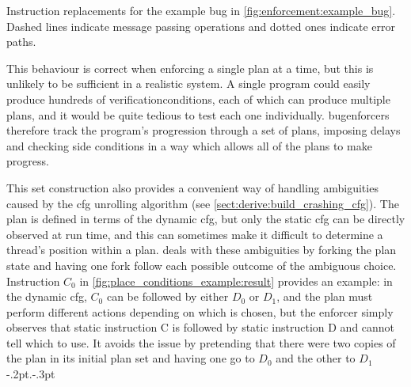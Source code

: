 \begin{sanefig}
  {\hfill}
  \caption{Instruction replacements for the example bug in
    \autoref{fig:enforcement:example_bug}.  Dashed lines indicate
    message passing operations and dotted ones indicate error paths.}
  \label{fig:enforcement:example_bug:replacements}
\end{sanefig}

This behaviour is correct when enforcing a single plan at a time, but
this is unlikely to be sufficient in a realistic system.  A single
program could easily produce hundreds of
\glspl{verificationcondition}, each of which can produce multiple
plans, and it would be quite tedious to test each one individually.
{\Technique} \glspl{bugenforcer} therefore track the program's
progression through a set of plans, imposing delays and checking
\glspl{side condition} in a way which allows all of the plans to make
progress.

This set construction also provides a convenient way of handling
ambiguities caused by the \gls{cfg} unrolling algorithm (see
\autoref{sect:derive:build_crashing_cfg}).  The plan is defined in
terms of the \gls{dynamic cfg}, but only the \gls{static cfg} can be
directly observed at run time, and this can sometimes make it
difficult to determine a thread's position within a plan.
{\Technique} deals with these ambiguities by forking the plan state
and having one fork follow each possible outcome of the ambiguous
choice.  Instruction $C_0$ in
\autoref{fig:place_conditions_example:result} provides an example: in
the \gls{dynamic cfg}, $C_0$ can be followed by either $D_0$ or $D_1$,
and the plan must perform different actions depending on which is
chosen, but the enforcer simply observes that static instruction C is
followed by static instruction D and cannot tell which to use.  It
avoids the issue by pretending that there were two copies of the plan
in its initial plan set and having one go to $D_0$ and the other to
$D_1$\kern-.2pt.\kern-.3pt

